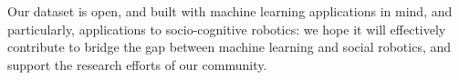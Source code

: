 \documentclass{article}
\begin{document}
Our dataset is open, and built with machine learning applications in mind, and
particularly, applications to socio-cognitive robotics: we hope it will
effectively contribute to bridge the gap between machine learning and social
robotics, and support the research efforts of our community.





\end{document}
